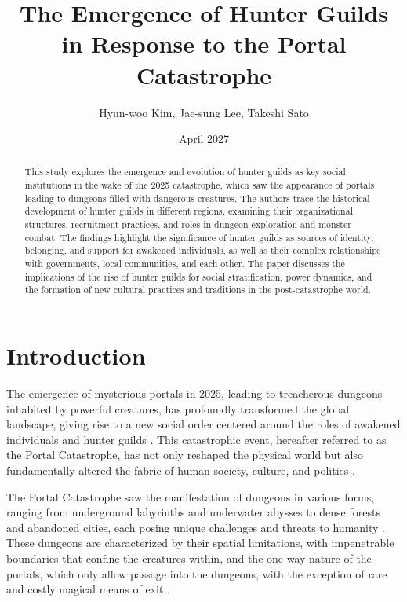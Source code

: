\documentclass[12pt]{article}
\begin{document}
\title{The Emergence of Hunter Guilds in Response to the Portal Catastrophe}
\author{Hyun-woo Kim, Jae-sung Lee, Takeshi Sato}
\date{April 2027}

\maketitle

\begin{abstract}
This study explores the emergence and evolution of hunter guilds as key social institutions in the wake of the 2025 catastrophe, which saw the appearance of portals leading to dungeons filled with dangerous creatures. The authors trace the historical development of hunter guilds in different regions, examining their organizational structures, recruitment practices, and roles in dungeon exploration and monster combat. The findings highlight the significance of hunter guilds as sources of identity, belonging, and support for awakened individuals, as well as their complex relationships with governments, local communities, and each other. The paper discusses the implications of the rise of hunter guilds for social stratification, power dynamics, and the formation of new cultural practices and traditions in the post-catastrophe world.
\end{abstract}

\section{Introduction}
The emergence of mysterious portals in 2025, leading to treacherous dungeons inhabited by powerful creatures, has profoundly transformed the global landscape, giving rise to a new social order centered around the roles of awakened individuals and hunter guilds \cite{Nakamura2026}. This catastrophic event, hereafter referred to as the Portal Catastrophe, has not only reshaped the physical world but also fundamentally altered the fabric of human society, culture, and politics \cite{Chen2026}.

The Portal Catastrophe saw the manifestation of dungeons in various forms, ranging from underground labyrinths and underwater abysses to dense forests and abandoned cities, each posing unique challenges and threats to humanity \cite{Novikova2027}. These dungeons are characterized by their spatial limitations, with impenetrable boundaries that confine the creatures within, and the one-way nature of the portals, which only allow passage into the dungeons, with the exception of rare and costly magical means of exit \cite{Kowalczyk2026}.
\end{document}
